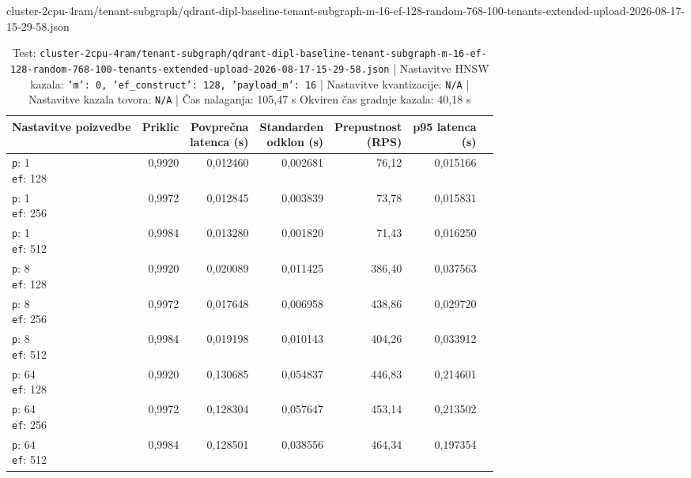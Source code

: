 \begin{table}[htbp]
  \centering
\small
  \caption{cluster-2cpu-4ram/tenant-subgraph/qdrant-dipl-baseline-tenant-subgraph-m-16-ef-128-random-768-100-tenants-extended-upload-2026-08-17-15-29-58.json}
  \label{tab:cluster-2cpu-4ram:tenant-subgraph:qdrant-dipl-baseline-tenant-subgraph-m-16-ef-128-random-768-100-tenants-extended-upload-2026-08-17-15-29-58.json}
  \begin{tabularx}{\textwidth}{Xrrrrrr}
    \toprule
    Nastavitve poizvedbe & Priklic & \makecell{Povprečna\\latenca (s)} & \makecell{Standarden\\odklon (s)} & \makecell{Prepustnost\\(RPS)} & \makecell{p95 latenca\\(s)}  \\
    \midrule
    \makecell{\texttt{p}: 1\\\texttt{ef}: 128} & 0,9920 & 0,012460 & 0,002681 & 76,12 & 0,015166 \\
    \makecell{\texttt{p}: 1\\\texttt{ef}: 256} & 0,9972 & 0,012845 & 0,003839 & 73,78 & 0,015831 \\
    \makecell{\texttt{p}: 1\\\texttt{ef}: 512} & 0,9984 & 0,013280 & 0,001820 & 71,43 & 0,016250 \\
    \makecell{\texttt{p}: 8\\\texttt{ef}: 128} & 0,9920 & 0,020089 & 0,011425 & 386,40 & 0,037563 \\
    \makecell{\texttt{p}: 8\\\texttt{ef}: 256} & 0,9972 & 0,017648 & 0,006958 & 438,86 & 0,029720 \\
    \makecell{\texttt{p}: 8\\\texttt{ef}: 512} & 0,9984 & 0,019198 & 0,010143 & 404,26 & 0,033912 \\
    \makecell{\texttt{p}: 64\\\texttt{ef}: 128} & 0,9920 & 0,130685 & 0,054837 & 446,83 & 0,214601 \\
    \makecell{\texttt{p}: 64\\\texttt{ef}: 256} & 0,9972 & 0,128304 & 0,057647 & 453,14 & 0,213502 \\
    \makecell{\texttt{p}: 64\\\texttt{ef}: 512} & 0,9984 & 0,128501 & 0,038556 & 464,34 & 0,197354 \\
    \bottomrule
  \end{tabularx}
\caption* {Test: \texttt{cluster-2cpu-4ram/tenant-subgraph/qdrant-dipl-baseline-tenant-subgraph-m-16-ef-128-random-768-100-tenants-extended-upload-2026-08-17-15-29-58.json} | Nastavitve HNSW kazala: \texttt{{'m': 0, 'ef\_construct': 128, 'payload\_m': 16}} | Nastavitve kvantizacije: \texttt{N/A} | Nastavitve kazala tovora: \texttt{N/A} | Čas nalaganja: 105,47 s Okviren čas gradnje kazala: 40,18 s}\end{table}



